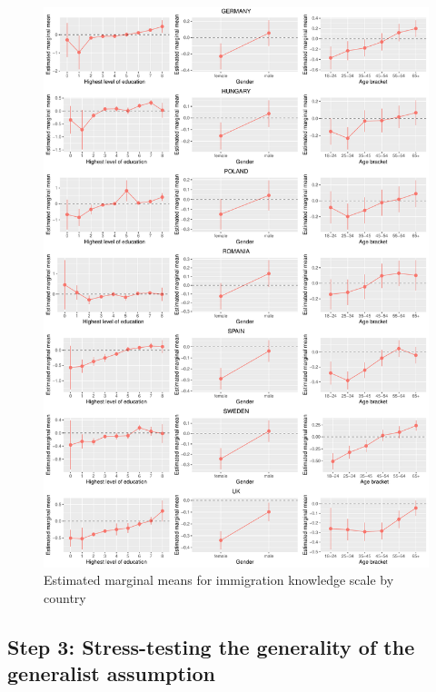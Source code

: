 \documentclass[11pt,halfline,a4paper,]{ouparticle}
\begin{document}
\begin{figure}[!h]
\includegraphics[width=1\linewidth]{Revisiting-the-Measurement-and-Dimensionality-of-Political-Knowledge--Evidence-from-Seven-European-Countries_files/figure-latex/emmeans_plots3b-1} \caption{Estimated marginal means for immigration knowledge scale by country}\label{fig:emmeans_plots3b}
\end{figure}

\hypertarget{step-3-stress-testing-the-generality-of-the-generalist-assumption}{%
\subsection{Step 3: Stress-testing the generality of the generalist
assumption}\label{step-3-stress-testing-the-generality-of-the-generalist-assumption}}
\end{document}
